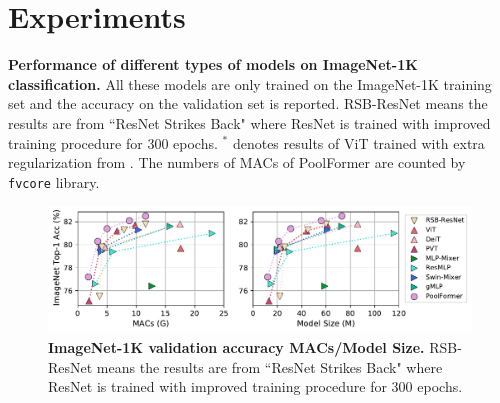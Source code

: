 \vspace{-5pt}
\section{Experiments}

\begin{table}[t]
    \centering
    \small
    
    \vspace{-3mm}
    \caption{
    \textbf{Performance of different types of models on ImageNet-1K  classification.} 
    All these models are only trained on the ImageNet-1K training set and the accuracy on the validation set is reported. RSB-ResNet means the results are from ``ResNet Strikes Back" \cite{resnet_improved} where ResNet \cite{resnet} is trained with improved training procedure for 300 epochs. $^*$ denotes results of ViT trained with extra regularization from \cite{mlp-mixer}. The numbers of MACs of PoolFormer are counted by \texttt{fvcore} \cite{fvcore} library.
    \label{tab:imagenet}}
    \vspace{-2mm}
\end{table}

\begin{figure}[t]
  \centering
   \includegraphics[width=0.95\linewidth]{figures/MetaFormer_full_plot.pdf}
   \vspace{-4mm}
   \caption{\textbf{ImageNet-1K validation accuracy \vs MACs/Model Size.} RSB-ResNet means the results are from ``ResNet Strikes Back" \cite{resnet_improved} where ResNet \cite{resnet} is trained with improved training procedure for 300 epochs.}
   \label{fig:overall_comparision}
\vspace{-1mm}
\end{figure}


